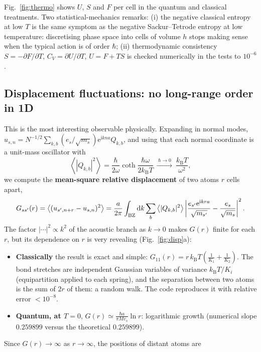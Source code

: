 \documentclass[11pt,a4paper]{article}
\newcommand{\kB}{k_{\mathrm B}}
\newcommand{\dd}{\mathrm{d}}
\newcommand{\ii}{\mathrm{i}}
\newcommand{\ee}{\mathrm{e}}
\newcommand{\avg}[1]{\left\langle #1\right\rangle}
\newcommand{\vs}{v_{s}}
\begin{document}
Fig.~\ref{fig:thermo} shows $U$, $S$ and $F$ per cell in the quantum and
classical treatments. Two statistical-mechanics remarks: (i) the negative
classical entropy at low $T$ is the same symptom as the negative Sackur–Tetrode
entropy at low temperature: discretising phase space into cells of volume $h$
stops making sense when the typical action is of order $\hbar$; (ii)
thermodynamic consistency $S=-\partial F/\partial T$, $C_V=\partial U/\partial T$,
$U=F+TS$ is checked numerically in the tests to $10^{-6}$.

\subsection{Displacement fluctuations: no long-range order in 1D}

This is the most interesting observable physically. Expanding in normal modes,
$u_{s,n}=N^{-1/2}\sum_{k,b}(e_s/\sqrt{m_s})\ee^{\ii kna}Q_{k,b}$, and using that
each normal coordinate is a unit-mass oscillator with
\begin{equation}
\avg{|Q_{k,b}|^2}=\frac{\hbar}{2\omega}\coth\frac{\hbar\omega}{2\kB T}
\ \xrightarrow{\ \hbar\to0\ }\ \frac{\kB T}{\omega^2},
\end{equation}
we compute the \textbf{mean-square relative displacement} of two atoms $r$
cells apart,
\begin{equation}
G_{ss'}(r)=\avg{(u_{s',n+r}-u_{s,n})^2}
=\frac{a}{2\pi}\int_{\rm BZ}\dd k\sum_b\avg{|Q_{k,b}|^2}
\left|\frac{e_{s'}\ee^{\ii kra}}{\sqrt{m_{s'}}}-\frac{e_s}{\sqrt{m_s}}\right|^2 .
\end{equation}
The factor $|\cdots|^2\propto k^2$ of the acoustic branch as $k\to0$ makes
$G(r)$ finite for each $r$, but its dependence on $r$ is very revealing
(Fig.~\ref{fig:disp}a):
\begin{itemize}
\item \textbf{Classically} the result is exact and simple:
  $G_{11}(r)=r\,\kB T\left(\frac{1}{K_1}+\frac{1}{K_2}\right)$. The bond stretches
  are independent Gaussian variables of variance $\kB T/K_i$ (equipartition
  applied to each spring), and the separation between two atoms is the sum of
  $2r$ of them: a random walk. The code reproduces it with relative error
  $<10^{-8}$.
\item \textbf{Quantum, at $T=0$}, $G(r)\simeq\frac{\hbar a}{\pi M\vs}\ln r$:
  logarithmic growth (numerical slope $0.259899$ versus the theoretical
  $0.259899$).
\end{itemize}
Since $G(r)\to\infty$ as $r\to\infty$, the positions of distant atoms are
\end{document}
